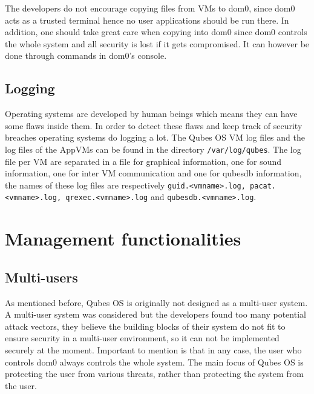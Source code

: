 \documentclass[runningheads,a4paper]{article}
\begin{document}
The developers do not encourage copying files from VMs to dom0, since
dom0 acts as a trusted terminal hence no user applications should be
run there. In addition, one should take great care when copying into
dom0 since dom0 controls the whole system and all security is lost if
it gets compromised.  It can however be done through commands in dom0's console.  

\subsection{Logging}

Operating systems are developed by human beings which means they can
have some flaws inside them. In order to detect these flaws and keep
track of security breaches operating systems do logging a lot. The
Qubes OS VM log files and the log files of the AppVMs can be found in
the directory \texttt{/var/log/qubes}. The log file per VM are
separated in a file for graphical information, one for sound
information, one for inter VM communication and one for qubesdb
information, the names of these log files are respectively
\texttt{guid.<vmname>.log, pacat.<vmname>.log, qrexec.<vmname>.log}
and \texttt{qubesdb.<vmname>.log}.

\section{Management functionalities}
\subsection{Multi-users} 

As mentioned before, Qubes OS is originally
not designed as a multi-user system.  A multi-user system was
considered but the developers found too many potential attack vectors,
they believe the building blocks of their system do not fit to ensure
security in a multi-user environment, so it can not be implemented
securely at the moment. Important to mention is that in any case, the
user who controls dom0 always controls the whole system. The main
focus of Qubes OS is protecting the user from various threats, rather
than protecting the system from the user.
\end{document}
